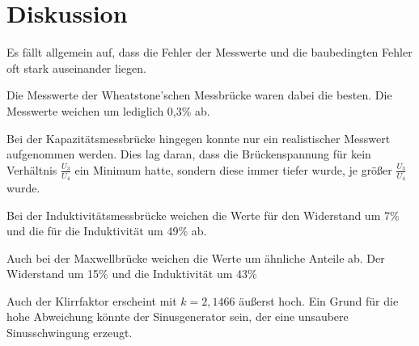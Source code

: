 \section{Diskussion}
\label{sec:Diskussion}
Es fällt allgemein auf, dass die Fehler der Messwerte und die baubedingten Fehler oft stark auseinander liegen.

Die Messwerte der Wheatstone'schen Messbrücke waren dabei die besten. Die Messwerte weichen um lediglich 0,3\% ab.

Bei der Kapazitätsmessbrücke hingegen konnte nur ein realistischer Messwert aufgenommen werden. Dies lag daran, dass die Brückenspannung für kein Verhältnis $\frac{U_3}{U_4}$
ein Minimum hatte, sondern diese immer tiefer wurde, je größer $\frac{U_3}{U_4}$ wurde.

Bei der Induktivitätsmessbrücke weichen die Werte für den Widerstand um 7\% und die für die Induktivität um 49\% ab.

Auch bei der Maxwellbrücke weichen die Werte um ähnliche Anteile ab. Der Widerstand um 15\% und die Induktivität um 43\%

Auch der Klirrfaktor erscheint mit $k = 2,1466$ äußerst hoch.
Ein Grund für die hohe Abweichung könnte der Sinusgenerator sein, der eine unsaubere Sinusschwingung erzeugt.